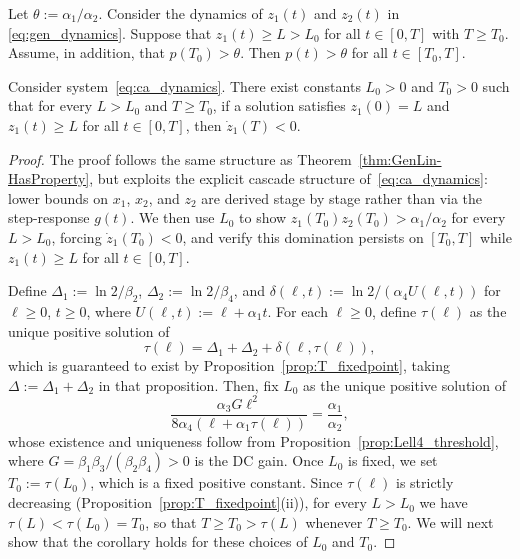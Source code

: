 \documentclass[10pt,a4paper]{amsart}
\begin{document}
\begin{lemma}\label{lem:p_above_theta}
    Let $\theta:=\alpha_1/\alpha_2$. Consider the dynamics of $z_1(t)$ and $z_2(t)$ in \eqref{eq:gen_dynamics}. Suppose that $z_1(t)\ge L>L_0$ for all $t\in[0,T]$ with $T\ge T_0$. Assume, in addition, that $p(T_0)>\theta$. Then $p(t)>\theta$ for all $t\in[T_0,T]$.
\end{lemma}

\begin{corollary}\label{cor:z1_decrease}
    Consider system~\eqref{eq:ca_dynamics}. There exist constants $L_0>0$ and 
    $T_0>0$ such that for every $L>L_0$ and $T\ge T_0$, if a solution satisfies 
    $z_1(0)=L$ and $z_1(t)\ge L$ for all $t\in[0,T]$, then $\dot z_1(T)<0$.
\end{corollary}

\begin{proof}
The proof follows the same structure as Theorem~\ref{thm:GenLin-HasProperty}, 
but exploits the explicit cascade structure of~\eqref{eq:ca_dynamics}: lower 
bounds on $x_1$, $x_2$, and $z_2$ are derived stage by stage rather than 
via the step-response $g(t)$. We then use $L_0$ to show 
$z_1(T_0)z_2(T_0)>\alpha_1/\alpha_2$ for every $L>L_0$, forcing 
$\dot z_1(T_0)<0$, and verify this domination persists on $[T_0,T]$ while 
$z_1(t)\ge L$ for all $t\in[0,T]$.

Define $\Delta_1 := \ln 2/\beta_2$, $\Delta_2 := \ln 2/\beta_4$, and 
$\delta(\ell,t) := \ln 2/(\alpha_4 U(\ell,t))$ for $\ell\ge0$, $t\ge 0$, 
where $U(\ell,t):=\ell+\alpha_1 t$. For each $\ell\ge0$, define $\tau(\ell)$ 
as the unique positive solution of
\begin{equation*}
    \tau(\ell) = \Delta_1 + \Delta_2 + \delta(\ell,\tau(\ell)),
\end{equation*}
which is guaranteed to exist by Proposition~\ref{prop:T_fixedpoint}, 
taking $\Delta := \Delta_1+\Delta_2$ in that proposition. Then, fix $L_0$ as the unique positive solution of
\begin{equation*}
    \frac{\alpha_3 G\ell^2}{8\alpha_4(\ell+\alpha_1\tau(\ell))} = \frac{\alpha_1}{\alpha_2},
\end{equation*}
whose existence and uniqueness follow from Proposition~\ref{prop:Lell4_threshold},
where $G = \beta_1\beta_3/(\beta_2\beta_4)>0$ is the DC gain.
Once $L_0$ is fixed, we set $T_0:=\tau(L_0)$, which is a fixed positive 
constant. Since $\tau(\ell)$ is strictly decreasing 
(Proposition~\ref{prop:T_fixedpoint}(ii)), for every $L>L_0$ we have 
$\tau(L)<\tau(L_0)=T_0$, so that $T\ge T_0>\tau(L)$ whenever $T\ge T_0$. 
We will next show that the corollary holds for these choices of $L_0$ and $T_0$.


\end{proof}
\end{document}
